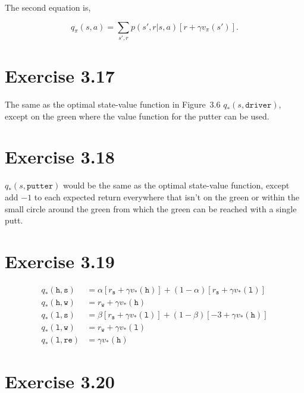\documentclass[a4paper, 12pt, titlepage]{article}
\begin{document}
The second equation is,

\begin{equation*}
        q_{\pi}(s, a) =
                \sum_{s', r} p(s', r | s, a)\left[r + \gamma v_{\pi}(s')\right].
\end{equation*}


\section{Exercise 3.17}

The same as the optimal state-value function in Figure~3.6
$q_*(s, \mathtt{driver})$, except on the green where the value function for the
putter can be used.


\section{Exercise 3.18}

$q_*(s, \mathtt{putter})$ would be the same as the optimal state-value
function, except add $-1$ to each expected return everywhere that isn't on the
green or within the small circle around the green from which the green can be
reached with a single putt.


\section{Exercise 3.19}

\begin{align*}
        q_*(\mathtt{h}, \mathtt{s}) &= \alpha [r_\mathtt{s} + \gamma v_*(\mathtt{h})] +
                                       (1 - \alpha)[r_\mathtt{s} + \gamma v_*(\mathtt{l})] \\
        q_*(\mathtt{h}, \mathtt{w}) &= r_\mathtt{w} + \gamma v_*(\mathtt{h}) \\
        q_*(\mathtt{l}, \mathtt{s}) &= \beta [r_\mathtt{s} + \gamma v_*(\mathtt{l})] +
                                       (1 - \beta)[-3 + \gamma v_*(\mathtt{h})] \\
        q_*(\mathtt{l}, \mathtt{w}) &= r_\mathtt{w} + \gamma v_*(\mathtt{l}) \\
        q_*(\mathtt{l}, \mathtt{re}) &= \gamma v_*(\mathtt{h})
\end{align*}


\section{Exercise 3.20}
\end{document}
